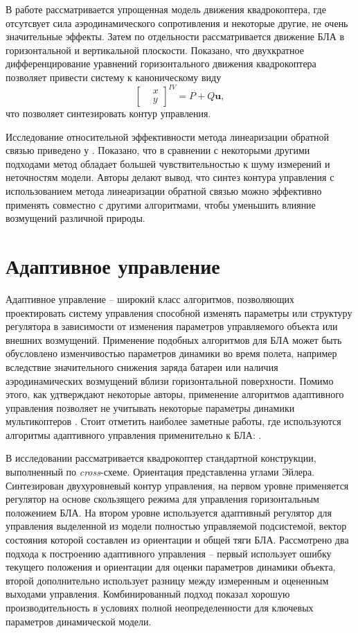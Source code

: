 В работе \cite{Kanatnikov} рассматривается упрощенная модель движения квадрокоптера, где отсутсвует сила аэродинамического сопротивления и некоторые другие, не очень значительные эффекты.
Затем по отдельности рассматривается движение БЛА в горизонтальной и вертикальной плоскости.
Показано, что двухкратное дифференцирование уравнений горизонтального движения квадрокоптера позволяет привести систему к каноническому виду 
\begin{equation*}
\begin{bmatrix}
&x\\ &y
\end{bmatrix} ^{IV}
=
P + Q \bm{u},
\end{equation*}
что позволяет синтезировать контур управления.

Исследование относительной эффективности метода линеаризации обратной связью приведено у \cite{Lee01}. Показано, что в сравнении с некоторыми другими подходами метод обладает большей чувствительностью к шуму измерений и неточностям модели. Авторы делают вывод, что синтез контура управления с использованием метода линеаризации обратной связью можно эффективно применять совместно с другими алгоритмами, чтобы уменьшить влияние возмущений различной природы.

\section{Адаптивное управление}

Адаптивное управление -- широкий класс алгоритмов, позволяющих проектировать систему управления способной изменять параметры или структуру регулятора в зависимости от изменения параметров управляемого объекта или внешних возмущений.
Применение подобных алгоритмов для БЛА может быть обусловлено изменчивостью параметров динамики во время полета, например вследствие значительного снижения заряда батареи или наличия аэродинамических возмущений вблизи горизонтальной поверхности. Помимо этого, как удтверждают некоторые авторы, применение алгоритмов адаптивного управления позволяет не учитывать некоторые параметры динамики мультикоптеров \cite{Belyavskiy01}. Стоит отметить наиболее заметные работы, где используются алгоритмы адаптивного управления применительно к БЛА: \cite{Dydek01, Mu01, Bara01}.

В исследовании \cite{Bara01} рассматривается квадрокоптер стандартной конструкции, выполненный по \textit{cross}-схеме. Ориентация представленна углами Эйлера. Синтезирован двухуровневый контур управления, на первом уровне применяется регулятор на основе скользящего режима для управления горизонтальным положением БЛА. На втором уровне используется адаптивный регулятор для управления выделенной из модели полностью управляемой подсистемой, вектор состояния которой составлен из ориентации и общей тяги БЛА. Рассмотрено два подхода к построению адаптивного управления -- первый использует ошибку текущего положения и ориентации для оценки параметров динамики объекта, второй дополнительно использует разницу между измеренным и оцененным выходами управления. Комбинированный подход показал хорошую производительность в условиях полной неопределенности для ключевых параметров динамической модели.

